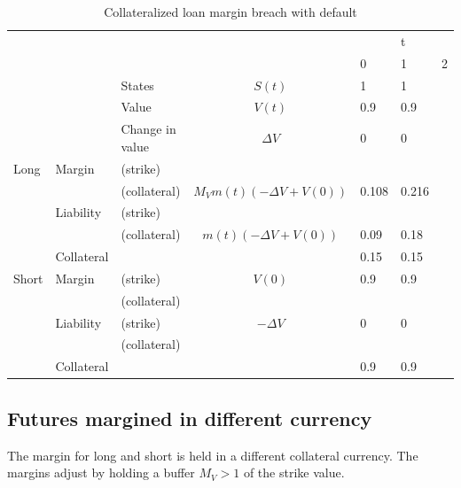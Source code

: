 \documentclass[12pt]{article}
\begin{document}
\begin{table}
\begin{tabular}{lll|c|lll}
&  &  &  &  & t &\\  
&  &  &  & 0 & 1 & 2\\
\hline
\hline
&  & States &  $S(t)$ & 1 & 1 & \\
&  & Value  &  $V(t)$  & 0.9 & 0.9 &  \\
&  & Change in value & $\Delta V$ & 0& 0 &  \\
\hline
Long      & Margin    & (strike)     &  &  &  &  \\
          &           & (collateral) & $M_V m(t)(-\Delta V + V(0))$ & 0.108 & 0.216 &\\ 
          & Liability & (strike)     &  &  &  & \\ 
          &           & (collateral)& $m(t)(-\Delta V + V(0))$& 0.09  & 0.18 &\\
          & Collateral&                       &    & 0.15 & 0.15 & \\
\hline
Short     & Margin    & (strike)     & $V(0)$ & 0.9 & 0.9 & \\
          &           & (collateral) & & & &\\
          & Liability & (strike)     & $-\Delta V$ & 0 & 0 & \\
          &           & (collateral) & & & &\\
          & Collateral&                       &    & 0.9 & 0.9 & \\ 
\hline          

\end{tabular}
\caption{Collateralized loan margin breach with default}
\label{fut}
\end{table}


\subsection{Futures margined in different currency}

The margin for long and short is held in a different collateral currency. The margins adjust by holding a buffer $M_V>1$ of the strike value.  
\end{document}
